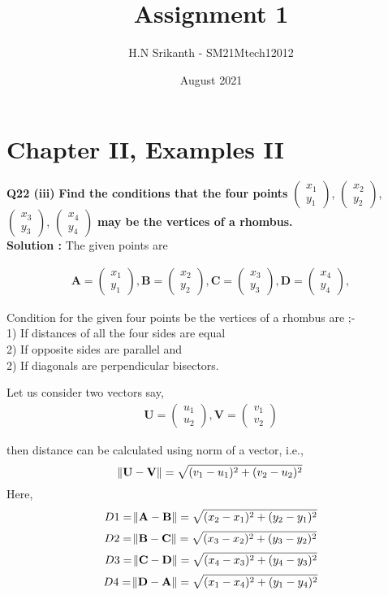 \documentclass{article}
\title{\textbf{\Huge Assignment 1}}
\author{\large H.N Srikanth - SM21Mtech12012}
\date{August 2021}
\begin{document}
\providecommand{\mbf}{\mathbf}


\newcommand{\myvec}[1]{\ensuremath{\begin{pmatrix}#1\end{pmatrix}}}
\let\vec\mathbf


\maketitle

\section*{Chapter II, Examples II}
\textbf{Q22 (iii)}
\textbf{Find the conditions that the four points}
\myvec{x_1\\y_1}, \myvec{x_2\\y_2},
\myvec{x_3\\y_3}, \myvec{x_4\\y_4}
\textbf{ may be the vertices of a rhombus.}\\

\textbf{Solution :}
\vspace{0.2cm}
 The given points are


\begin{align*}
\vec{A} = \myvec{x_1\\y_1}, \vec{B} =\myvec{x_2\\y_2},
\vec{C} =\myvec{x_3\\y_3}, \vec{D} =\myvec{x_4\\y_4},
\end{align*}


Condition for the given four points be the vertices of a rhombus are ;-\\
1) If distances of all the four sides are equal\\
2) If opposite sides are parallel and\\
2) If diagonals are perpendicular bisectors.

\vspace{0.2cm}

Let us consider two vectors say,
\begin{align*}
\vec{U} = \myvec{u_1\\u_2}, \vec{V} =\myvec{v_1\\v_2}
\end{align*} 


then distance can be calculated using norm of a vector, i.e., 
$$\norm{ \vec{U} - \vec{V}} = \sqrt{(v_1-u_1)^2+(v_2-u_2)^2}$$
Here, $$ D1=\norm{ \vec{A} - \vec{B}} =\sqrt{(x_2-x_1)^2+(y_2-y_1)^2}$$
$$ D2=\norm{ \vec{B} - \vec{C}} =\sqrt{(x_3-x_2)^2+(y_3-y_2)^2}$$
$$ D3=\norm{ \vec{C} - \vec{D}} =\sqrt{(x_4-x_3)^2+(y_4-y_3)^2}$$
$$ D4=\norm{ \vec{D} - \vec{A}} =\sqrt{(x_1-x_4)^2+(y_1-y_4)^2}$$
\end{document}
